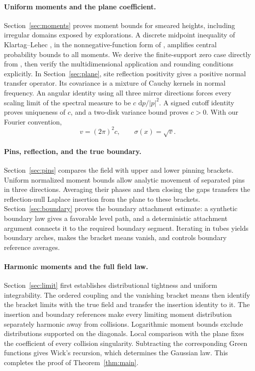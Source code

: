 \documentclass[11pt]{article}
\newcommand{\dd}{\,\mathrm d}
\theoremstyle{definition}
\theoremstyle{remark}
\numberwithin{equation}{section}
\begin{document}
\paragraph{Uniform moments and the plane coefficient.}
Section~\ref{sec:moments} proves moment bounds for smeared heights,
including irregular domains exposed by explorations.  A discrete midpoint
inequality of Klartag--Lehec \cite[Theorem~1.4]{KlartagLehec2019}, in the
nonnegative-function form of \cite[Theorem~3]{GRST2019}, amplifies central
probability bounds to all moments.  We derive the finite-support zero
case directly from \cite[Theorem~8]{GRST2019}, then verify the
multidimensional application and rounding conditions explicitly.
In Section~\ref{sec:plane},
site reflection positivity gives a positive normal transfer operator.
Its covariance is a mixture of Cauchy kernels in normal frequency.
An angular identity using all three mirror directions forces every
scaling limit of the spectral measure to be $c\,\dd p/|p|^2$.
A signed cutoff identity proves uniqueness of $c$, and a two-disk variance
bound proves $c>0$.  With our Fourier convention,
\begin{equation}\label{eq:normalization}
 v=(2\pi)^2c,\qquad \sigma(x)=\sqrt v.
\end{equation}

\paragraph{Pins, reflection, and the true boundary.}
Section~\ref{sec:pins} compares the field with upper and lower pinning
brackets.  Uniform normalized moment bounds allow analytic movement of
separated pins in three directions.  Averaging their phases and then
closing the gaps transfers the reflection-null Laplace insertion from
the plane to these brackets.  Section~\ref{sec:boundary} proves the
boundary attachment estimate: a synthetic boundary law gives a favorable
level path, and a deterministic attachment argument connects it to the
required boundary segment.  Iterating in tubes yields boundary arches,
makes the bracket means vanish, and controls boundary reference averages.

\paragraph{Harmonic moments and the full field law.}
Section~\ref{sec:limit} first establishes distributional tightness and
uniform integrability.  The ordered coupling and the vanishing bracket
means then identify the bracket limits with the true field and transfer
the insertion identity to it.  The insertion and boundary references
make every limiting moment distribution separately harmonic away from
collisions.  Logarithmic moment bounds exclude distributions supported
on the diagonals.  Local comparison with the plane fixes the coefficient
of every collision singularity.  Subtracting the corresponding Green
functions gives Wick's recursion, which determines the Gaussian law.
This completes the proof of Theorem~\ref{thm:main}.
\end{document}
